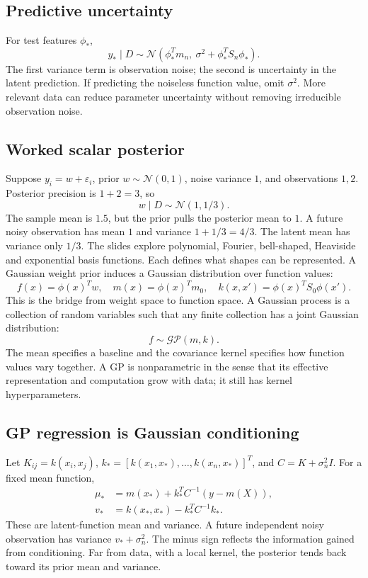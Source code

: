 \documentclass[11pt]{article}
\begin{document}
\subsection{Predictive uncertainty}
For test features $\phi_*$,
\[
y_*\mid D\sim\mathcal N(\phi_*^Tm_n,\ \sigma^2+\phi_*^TS_n\phi_*).
\]
The first variance term is observation noise; the second is uncertainty in the latent prediction. If predicting the noiseless function value, omit $\sigma^2$. More relevant data can reduce parameter uncertainty without removing irreducible observation noise.
\subsection{Worked scalar posterior}
Suppose $y_i=w+\varepsilon_i$, prior $w\sim\mathcal N(0,1)$, noise variance $1$, and observations $1,2$. Posterior precision is $1+2=3$, so
\[
w\mid D\sim\mathcal N(1,1/3).
\]
The sample mean is $1.5$, but the prior pulls the posterior mean to $1$. A future noisy observation has mean $1$ and variance $1+1/3=4/3$. The latent mean has variance only $1/3$.
The slides explore polynomial, Fourier, bell-shaped, Heaviside and exponential basis functions. Each defines what shapes can be represented. A Gaussian weight prior induces a Gaussian distribution over function values:
\[
f(x)=\phi(x)^Tw,\quad
m(x)=\phi(x)^Tm_0,\quad
k(x,x')=\phi(x)^TS_0\phi(x').
\]
This is the bridge from weight space to function space. A Gaussian process is a collection of random variables such that any finite collection has a joint Gaussian distribution:
\[
f\sim\mathcal{GP}(m,k).
\]
The mean specifies a baseline and the covariance kernel specifies how function values vary together. A GP is nonparametric in the sense that its effective representation and computation grow with data; it still has kernel hyperparameters.
\subsection{GP regression is Gaussian conditioning}
Let $K_{ij}=k(x_i,x_j)$, $k_*=[k(x_1,x_*),\ldots,k(x_n,x_*)]^T$, and $C=K+\sigma_n^2I$. For a fixed mean function,
\begin{align*}
\mu_*&=m(x_*)+k_*^TC^{-1}(y-m(X)),\\
v_*&=k(x_*,x_*)-k_*^TC^{-1}k_*.
\end{align*}
These are latent-function mean and variance. A future independent noisy observation has variance $v_*+\sigma_n^2$. The minus sign reflects the information gained from conditioning. Far from data, with a local kernel, the posterior tends back toward its prior mean and variance.
\end{document}
